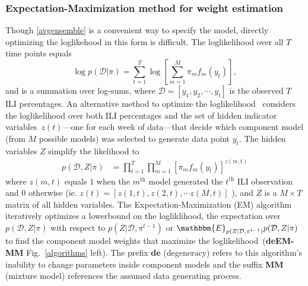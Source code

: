 \documentclass[sagev,times,Review,10pt]{sagej}
\def\l{\left}
\def\r{\right}
\def\dx{\hspace{5mm}}
\begin{document}

\subsubsection{Expectation-Maximization method for weight estimation}
Though \eqref{avgensemble} is a convenient way to specify the model, directly optimizing the loglikehood in this form is difficult.
The loglikelihood over all $T$ time points equals
\begin{equation}
    \log p(\mathcal{D} | \pi ) = \sum_{t=1}^{T} \log\l[\sum_{m=1}^{M} \pi_m f_{m}(y_{t})\r], \label{LL}
\end{equation}
and is a summation over log-sums, where $\mathcal{D} = [y_{1}, y_{2}, \cdots, y_{t}]$ is the observed $T$ ILI percentages. 
An alternative method to optimize the loglikelihood~\citep{bishop2006pattern,murphy2012machine} considers the loglikelihood over both ILI percentages and the set of hidden indicator variables~$z(t)$---one for each week of data---that decide which component model (from $M$ possible models) was selected to generate data point $y_{t}$.
The hidden variables $Z$ simplify the likelihood to
\begin{equation}
  \begin{aligned}
    p(\mathcal{D},Z | \pi ) &= \prod_{t=1}^{T} \prod_{m=1}^{M} \l[\pi_m f_{m}(y_{t})\r]^{z(m,t)}\label{emLiklihood}
  \end{aligned}
\end{equation}
where $z(m,t)$ equals $1$ when the $m^{\text{th}}$ model generated the $t^{\text{th}}$ ILI observation and $0$ otherwise (ie. $z(t) = [z(1,t), z(2,t),\cdots z(M,t)]$ ), and $Z$ is a $M \times T$ matrix of all hidden variables.
The Expectation-Maximization (EM) algorithm~\citep{dempster1977maximum} iteratively optimizes a lowerbound on the logliklihood, the expectation over $p(\mathcal{D},Z | \pi )$ with respect to $p(Z | \mathcal{D}, \pi^{t-1})$ or $\mathbbm{E}_{p(Z | \mathcal{D}, \pi^{t-1})} p(\mathcal{D},Z | \pi )$ to find the component model weights that maximize the loglikelihood~(\textbf{deEM-MM} Fig.~\ref{algorithms} left).
The prefix \textbf{de} (degeneracy) refers to this algorithm's inability to change parameters inside component models and the suffix \textbf{MM} (mixture model) references the assumed data generating process.
\end{document}
